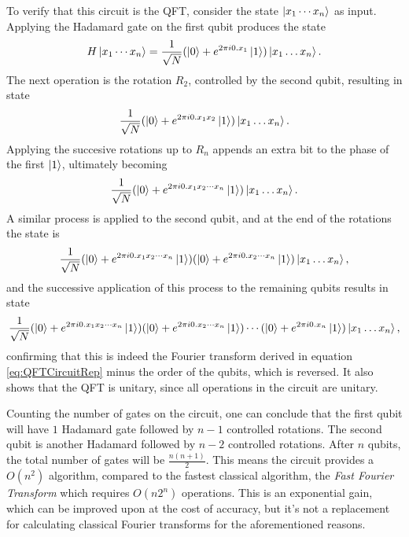 \documentclass[../../dissertation.tex]{subfiles}
\begin{document}
To verify that this circuit is the QFT, consider the state $\ket{x_1\cdots x_n}$ as input. Applying the Hadamard gate on the first qubit produces the state
\begin{equation}
	H \ket{x_1 \cdots x_n} = \frac{1}{\sqrt{N}} ( \ket{0} + e^{2\pi i 0.x_1} \ket{1}) \ket{x_1\dots x_n}. 
\end{equation}
The next operation is the rotation $R_2$, controlled by the second qubit, resulting in state
\begin{equation}
	\frac{1}{\sqrt{N}} ( \ket{0} + e^{2\pi i 0.x_1x_2} \ket{1}) \ket{x_1\dots x_n}.
\end{equation}
Applying the succesive rotations up to $R_n$ appends an extra bit to the phase of the first $\ket{1}$, ultimately becoming
\begin{equation}
	\frac{1}{\sqrt{N}} ( \ket{0} + e^{2\pi i 0.x_1x_2\cdots x_n} \ket{1}) \ket{x_1\dots x_n}.
\end{equation}
A similar process is applied to the second qubit, and at the end of the rotations the state is
\begin{equation}
	\frac{1}{\sqrt{N}} ( \ket{0} + e^{2\pi i 0.x_1x_2\cdots x_n} \ket{1})  ( \ket{0} + e^{2\pi i 0.x_2\cdots x_n} \ket{1})\ket{x_1\dots x_n},
\end{equation}
and the successive application of this process to the remaining qubits results in state
\begin{equation}
	\frac{1}{\sqrt{N}} ( \ket{0} + e^{2\pi i 0.x_1x_2\cdots x_n} \ket{1})  ( \ket{0} + e^{2\pi i 0.x_2\cdots x_n} \ket{1})\cdots ( \ket{0} + e^{2\pi i 0.x_n} \ket{1})\ket{x_1\dots x_n},
\end{equation}
confirming that this is indeed the Fourier transform derived in equation \ref{eq:QFTCircuitRep} minus the order of the qubits, which is reversed. It also shows that the QFT is unitary, since all operations in the circuit are unitary.\par
Counting the number of gates on the circuit, one can conclude that the first qubit will have $1$ Hadamard gate followed by $n-1$ controlled rotations. The second qubit is another Hadamard followed by $n-2$ controlled rotations. After $n$ qubits, the total number of gates will be $\frac{n(n+1)}{2}$. This means the circuit provides a $O(n^2)$ algorithm, compared to the fastest classical algorithm, the \textit{Fast Fourier Transform} which requires $O(n2^n)$ operations. This is an exponential gain, which can be improved upon at the cost of accuracy, but it's not a replacement for calculating classical Fourier transforms for the aforementioned reasons. 
\end{document}
